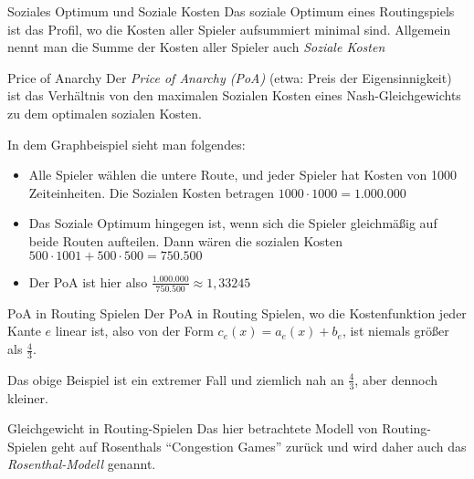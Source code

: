 \documentclass{panikzettel}
\newcommand{\boxspace}{	\vspace{-\baselineskip}	}
\begin{document}
{\begin{halfboxr}
	
	\begin{defi}{Soziales Optimum und Soziale Kosten}
		Das soziale Optimum eines Routingspiels ist das Profil, wo die Kosten aller Spieler aufsummiert minimal sind. Allgemein nennt man die Summe der Kosten aller Spieler auch \emph{Soziale Kosten}
	\end{defi}

	\begin{defi}{Price of Anarchy}
		Der \emph{Price of Anarchy (PoA)}  (etwa: Preis der Eigensinnigkeit) ist das Verhältnis von den maximalen Sozialen Kosten eines Nash-Gleichgewichts zu dem optimalen sozialen Kosten.
	\end{defi}
\end{halfboxr}

In dem Graphbeispiel sieht man folgendes:

\begin{itemize}
	\item Alle Spieler wählen die untere Route, und jeder Spieler hat Kosten von 1000 Zeiteinheiten. Die Sozialen Kosten betragen $1000 \cdot 1000 = 1.000.000$
	\item Das Soziale Optimum hingegen ist, wenn sich die Spieler gleichmäßig auf beide Routen aufteilen. Dann wären die sozialen Kosten $500 \cdot 1001 + 500 \cdot 500 = 750.500$
	\item Der PoA ist hier also $\frac{1.000.000}{750.500} \approx 1, 33245$
\end{itemize}

\begin{halfboxl}
	\boxspace
\begin{theo}{PoA in Routing Spielen}
	Der PoA in Routing Spielen, wo die Kostenfunktion jeder Kante $e$ linear ist, also von der Form $c_e(x) = a_e(x) + b_e$, ist niemals größer als $\frac{4}{3}$.
	
	Das obige Beispiel ist ein extremer Fall und ziemlich nah an $\frac{4}{3}$, aber dennoch kleiner.
\end{theo}
\end{halfboxl}%
\begin{halfboxr}
	\boxspace
	\begin{theo}{Gleichgewicht in Routing-Spielen}
		Das hier betrachtete Modell von Routing-Spielen geht auf Rosenthals ``Congestion Games'' zurück und wird daher auch das \emph{Rosenthal-Modell} genannt.
		

\end{theo}
\end{halfboxr}}
\end{document}
